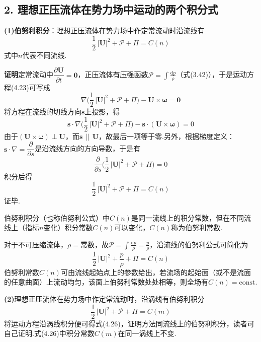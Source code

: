 \subsection*{2. 理想正压流体在势力场中运动的两个积分式}

\textbf{(1)伯努利积分}：理想正压流体在势力场中作定常流动时沿流线有
\begin{equation*}
\frac{1}{2}\,|\boldsymbol{U}|^{2}+\mathscr{P}+\Pi=C(n)
\tag{4.24}
\end{equation*}
式中$n$代表不同流线.

\textbf{证明}\quad 定常流动中$\dfrac{\partial\boldsymbol{U}}{\partial t}=\boldsymbol{0}$，正压流体有压强函数$\mathscr{P}=\displaystyle\int\frac{\mathrm{d}p}{\rho}$（式(3.42)），于是运动方程(4.23)可写成
\[
\nabla\Big(\frac{1}{2}\,|\boldsymbol{U}|^{2}+\mathscr{P}+\Pi\Big)-\boldsymbol{U}\times\boldsymbol{\omega}=\boldsymbol{0}
\]
将方程在流线的切线方向$\boldsymbol{s}$上投影，得
\[
\boldsymbol{s}\cdot\nabla\Big(\frac{1}{2}\,|\boldsymbol{U}|^{2}+\mathscr{P}+\Pi\Big)-\boldsymbol{s}\cdot(\boldsymbol{U}\times\boldsymbol{\omega})=0
\]
由于$(\boldsymbol{U}\times\boldsymbol{\omega})\perp\boldsymbol{U}$，而$\boldsymbol{s}\,\|\,\boldsymbol{U}$，故最后一项等于零.另外，根据梯度定义：$\boldsymbol{s}\cdot\nabla=\dfrac{\partial}{\partial s}$是沿流线方向的方向导数，于是有
\[
\frac{\partial}{\partial s}\Big(\frac{1}{2}\,|\boldsymbol{U}|^{2}+\mathscr{P}+\Pi\Big)=0
\]
积分后得
\[
\frac{1}{2}\,|\boldsymbol{U}|^{2}+\mathscr{P}+\Pi=C(n)
\]
证毕.

伯努利积分（也称伯努利公式）中$C(n)$是同一流线上的积分常数，但在不同流线上（指标$n$变化）积分常数$C(n)$可以变化，$C(n)$称为伯努利常数.

对于不可压缩流体，$\rho=$常数，故$\mathscr{P}=\displaystyle\int\frac{\mathrm{d}p}{\rho}=\frac{p}{\rho}$，沿流线的伯努利公式可简化为
\begin{equation*}
\frac{1}{2}\,|\boldsymbol{U}|^{2}+\frac{p}{\rho}+\Pi=C(n)
\tag{4.25}
\end{equation*}
伯努利常数$C(n)$可由流线起始点上的参数给出，若流场的起始面（或不是流面的任意曲面）上流动均匀，该面上伯努利常数处处相等，则全场有$C(n)=\mathrm{const.}$

\textbf{(2)}理想正压流体在势力场中作定常流动时，沿涡线有伯努利积分
\begin{equation*}
\frac{1}{2}\,|\boldsymbol{U}|^{2}+\mathscr{P}+\Pi=C(m)
\tag{4.26}
\end{equation*}
将运动方程沿涡线积分便可得式(4.26)，证明方法同流线上的伯努利积分，读者可自己证明.式(4.26)中积分常数$C(m)$在同一涡线上不变.


